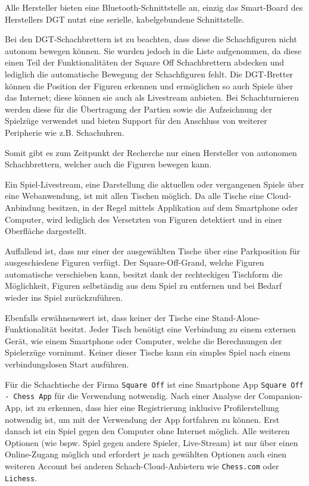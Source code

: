 Alle Hersteller bieten eine Bluetooth-Schnittstelle an, einzig das
Smart-Board des Herstellers DGT nutzt eine serielle, kabelgebundene
Schnittstelle.

Bei den DGT-Schachbrettern ist zu beachten, dass diese die Schachfiguren
nicht autonom bewegen können. Sie wurden jedoch in die Liste
aufgenommen, da diese einen Teil der Funktionalitäten der Square Off
Schachbrettern abdecken und lediglich die automatische Bewegung der
Schachfiguren fehlt. Die DGT-Bretter können die Position der Figuren
erkennen und ermöglichen so auch Spiele über das Internet; diese können
sie auch als Livestream anbieten. Bei Schachturnieren werden diese für
die Übertragung der Partien sowie die Aufzeichnung der Spielzüge
verwendet und bieten Support für den Anschluss von weiterer Peripherie
wie z.B. Schachuhren.

Somit gibt es zum Zeitpunkt der Recherche nur einen Hersteller von
autonomen Schachbrettern, welcher auch die Figuren bewegen kann.

Ein Spiel-Livestream, eine Darstellung die aktuellen oder vergangenen
Spiele über eine Webanwendung, ist mit allen Tischen möglich. Da alle
Tische eine Cloud-Anbindung besitzen, in der Regel mittels Applikation
auf dem Smartphone oder Computer, wird lediglich des Versetzten von
Figuren detektiert und in einer Oberfläche dargestellt.

Auffallend ist, dass nur einer der ausgewählten Tische über eine
Parkposition für ausgeschiedene Figuren verfügt. Der Square-Off-Grand,
welche Figuren automatische verschieben kann, besitzt dank der
rechteckigen Tischform die Möglichkeit, Figuren selbständig aus dem
Spiel zu entfernen und bei Bedarf wieder ins Spiel zurückzuführen.

Ebenfalls erwähnenswert ist, dass keiner der Tische eine
Stand-Alone-Funktionalität besitzt. Jeder Tisch benötigt eine Verbindung
zu einem externen Gerät, wie einem Smartphone oder Computer, welche die
Berechnungen der Spielerzüge vornimmt. Keiner dieser Tische kann ein
simples Spiel nach einem verbindungslosen Start ausführen.

Für die Schachtische der Firma \passthrough{\lstinline!Square Off!} ist
eine Smartphone App
\passthrough{\lstinline!Square Off - Chess App!}\cite{squareoffapp}
für die Verwendung notwendig. Nach einer Analyse der Companion-App, ist
zu erkennen, dass hier eine Registrierung inklusive Profilerstellung
notwendig ist, um mit der Verwendung der App fortfahren zu können. Erst
danach ist ein Spiel gegen den Computer ohne Internet möglich. Alle
weiteren Optionen (wie bspw. Spiel gegen andere Spieler, Live-Stream)
ist nur über einen Online-Zugang möglich und erfordert je nach gewählten
Optionen auch einen weiteren Account bei anderen Schach-Cloud-Anbietern
wie \passthrough{\lstinline!Chess.com!} oder
\passthrough{\lstinline!Lichess!}.


